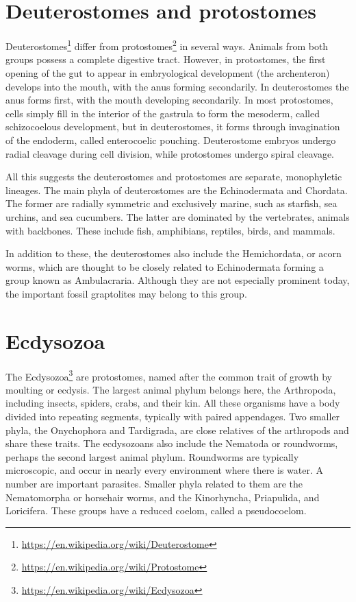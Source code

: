 \documentclass[]{book}
\let\rmarkdownfootnote\footnote%
\def\footnote{\protect\rmarkdownfootnote}
\renewcommand{\href}[2]{#2\footnote{\url{#1}}}
\theoremstyle{definition}
\theoremstyle{definition}
\theoremstyle{definition}
\theoremstyle{remark}
\begin{document}
\section{Deuterostomes and
protostomes}\label{deuterostomes-and-protostomes}

\href{https://en.wikipedia.org/wiki/Deuterostome}{Deuterostomes} differ
from \href{https://en.wikipedia.org/wiki/Protostome}{protostomes} in
several ways. Animals from both groups possess a complete digestive
tract. However, in protostomes, the first opening of the gut to appear
in embryological development (the archenteron) develops into the mouth,
with the anus forming secondarily. In deuterostomes the anus forms
first, with the mouth developing secondarily. In most protostomes, cells
simply fill in the interior of the gastrula to form the mesoderm, called
schizocoelous development, but in deuterostomes, it forms through
invagination of the endoderm, called enterocoelic pouching. Deuterostome
embryos undergo radial cleavage during cell division, while protostomes
undergo spiral cleavage.

All this suggests the deuterostomes and protostomes are separate,
monophyletic lineages. The main phyla of deuterostomes are the
Echinodermata and Chordata. The former are radially symmetric and
exclusively marine, such as starfish, sea urchins, and sea cucumbers.
The latter are dominated by the vertebrates, animals with backbones.
These include fish, amphibians, reptiles, birds, and mammals.

In addition to these, the deuterostomes also include the Hemichordata,
or acorn worms, which are thought to be closely related to Echinodermata
forming a group known as Ambulacraria. Although they are not especially
prominent today, the important fossil graptolites may belong to this
group.

\section{Ecdysozoa}\label{ecdysozoa}

The \href{https://en.wikipedia.org/wiki/Ecdysozoa}{Ecdysozoa} are
protostomes, named after the common trait of growth by moulting or
ecdysis. The largest animal phylum belongs here, the Arthropoda,
including insects, spiders, crabs, and their kin. All these organisms
have a body divided into repeating segments, typically with paired
appendages. Two smaller phyla, the Onychophora and Tardigrada, are close
relatives of the arthropods and share these traits. The ecdysozoans also
include the Nematoda or roundworms, perhaps the second largest animal
phylum. Roundworms are typically microscopic, and occur in nearly every
environment where there is water. A number are important parasites.
Smaller phyla related to them are the Nematomorpha or horsehair worms,
and the Kinorhyncha, Priapulida, and Loricifera. These groups have a
reduced coelom, called a pseudocoelom.
\end{document}
